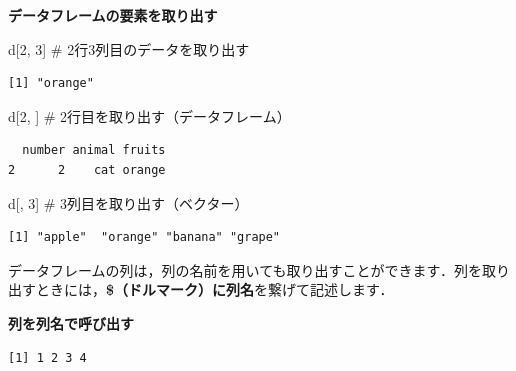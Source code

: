 \documentclass[
  letterpaper,
  DIV=11,
  numbers=noendperiod]{scrreprt}
\newenvironment{Shaded}{\begin{snugshade}}{\end{snugshade}}
\newcommand{\CommentTok}[1]{\textcolor[rgb]{0.37,0.37,0.37}{#1}}
\newcommand{\DecValTok}[1]{\textcolor[rgb]{0.68,0.00,0.00}{#1}}
\newcommand{\NormalTok}[1]{\textcolor[rgb]{0.00,0.23,0.31}{#1}}
\newcommand{\SpecialCharTok}[1]{\textcolor[rgb]{0.37,0.37,0.37}{#1}}
\begin{document}
\textbf{データフレームの要素を取り出す}

\begin{Shaded}
\begin{Highlighting}[]
\NormalTok{d[}\DecValTok{2}\NormalTok{, }\DecValTok{3}\NormalTok{] }\CommentTok{\# 2行3列目のデータを取り出す}
\end{Highlighting}
\end{Shaded}

\begin{verbatim}
[1] "orange"
\end{verbatim}

\begin{Shaded}
\begin{Highlighting}[]
\NormalTok{d[}\DecValTok{2}\NormalTok{, ] }\CommentTok{\# 2行目を取り出す（データフレーム）}
\end{Highlighting}
\end{Shaded}

\begin{verbatim}
  number animal fruits
2      2    cat orange
\end{verbatim}

\begin{Shaded}
\begin{Highlighting}[]
\NormalTok{d[, }\DecValTok{3}\NormalTok{] }\CommentTok{\# 3列目を取り出す（ベクター）}
\end{Highlighting}
\end{Shaded}

\begin{verbatim}
[1] "apple"  "orange" "banana" "grape" 
\end{verbatim}

データフレームの列は，列の名前を用いても取り出すことができます．列を取り出すときには，\textbf{\$（ドルマーク）に列名}を繋げて記述します．

\textbf{列を列名で呼び出す}

\begin{Shaded}
\end{Shaded}

\begin{verbatim}
[1] 1 2 3 4
\end{verbatim}

\begin{Shaded}
\end{Shaded}
\end{document}
